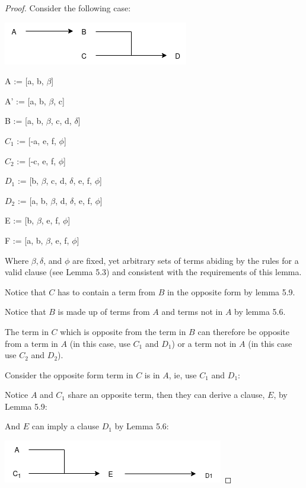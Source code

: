 \documentclass[manuscript]{acmart}
\begin{document}
    \begin{proof}

        Consider the following case:

        \includegraphics[scale=0.8]{318}

        A := [a, b, $\beta$]
        
        A' := [a, b, $\beta$, c]

        B := [a, b, $\beta$, c, d, $\delta$]

        $C_1$ := [-a, e, f, $\phi$]

        $C_2$ := [-c, e, f, $\phi$]

        $D_1$ := [b, $\beta$, c, d, $\delta$, e, f, $\phi$]

        $D_2$ := [a, b, $\beta$, d, $\delta$, e, f, $\phi$]

        E := [b, $\beta$, e, f, $\phi$]

        F := [a, b, $\beta$, e, f, $\phi$]

        Where $\beta, \delta$, and $\phi$ are fixed, yet arbitrary sets of terms 
        abiding by the rules for a valid clause (see Lemma 5.3) and consistent
        with the requirements of this lemma.

        Notice that $C$ has to contain a term from $B$ in the opposite form by 
        lemma 5.9.

        Notice that $B$ is made up of terms from $A$ and terms not in $A$
        by lemma 5.6.

        The term in $C$ which is opposite from the term in $B$ can therefore
        be opposite from a term
        in $A$ (in this case, use $C_1$ and $D_1$) or a 
        term not in $A$ (in this case use $C_2$ and $D_2$).
        
        Consider the opposite form term in $C$ is in $A$, ie, use $C_1$
        and $D_1$:

        Notice $A$ and $C_1$ share an opposite term, then they can derive
        a clause, $E$, by Lemma 5.9:

        And $E$ can imply a clause $D_1$ by Lemma 5.6:

        \includegraphics[scale=0.8]{318b.png}


\end{proof}
\end{document}
